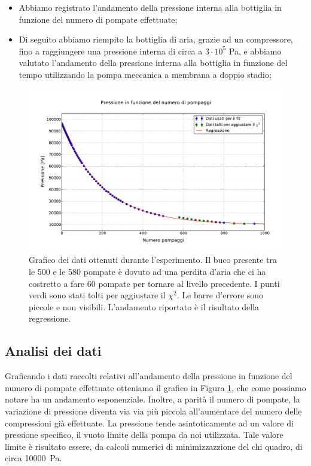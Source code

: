 \begin{itemize}
	\item{Abbiamo registrato l'andamento della pressione interna alla bottiglia in funzione del numero di pompate effettuate;}
	\item{Di seguito abbiamo riempito la bottiglia di aria, grazie ad un compressore, fino a raggiungere una pressione
	interna di circa a $3 \cdot 10^5$ \si{\pascal}, e abbiamo valutato l'andamento della pressione interna alla bottiglia
	in funzione del tempo utilizzando la pompa meccanica a membrana a doppio stadio;}
\end{itemize}

\begin{figure}[h!]
    \includegraphics[width=160mm]{graph.pdf}
    \caption{Grafico dei dati ottenuti durante l'esperimento. Il buco presente tra le 500 e le 580 pompate è dovuto ad una perdita d'aria
    che ci ha costretto a fare 60 pompate per tornare al livello precedente. I punti verdi sono stati tolti per aggiustare il $\chi^2$.
    Le barre d'errore sono piccole e non visibili. L'andamento riportato è il risultato della regressione.}
    \label{fig:graph1}
\end{figure}

\subsection{Analisi dei dati}

Graficando i dati raccolti relativi all'andamento della pressione in funzione del numero di pompate effettuate otteniamo
il grafico in Figura \ref{fig:graph1}, che come possiamo notare ha un andamento esponenziale. Inoltre, a parità
il numero di pompate, la variazione di pressione diventa via via più piccola all'aumentare del numero delle
compressioni già effettuate. La pressione tende asintoticamente ad un valore di pressione specifico, il vuoto limite della pompa
da noi utilizzata. Tale valore limite è risultato essere, da calcoli numerici di minimizzazzione del chi quadro, di circa \SI{10000}{\pascal}.

